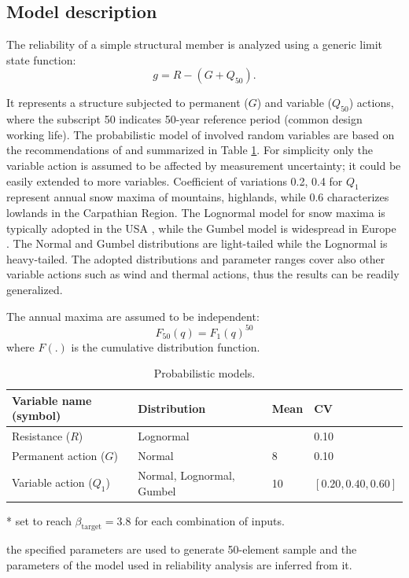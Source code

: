 \subsection{Model description}
The reliability of a simple structural member is analyzed using a generic limit state function:
\begin{equation}
	 g = R - \left( {G + {Q_{50}}} \right).
\end{equation}

It represents a structure subjected to permanent ($G$) and variable ($Q_{50}$) actions, where the subscript 50 indicates 50-year reference period (common design working life). The probabilistic model of involved random variables are based on the recommendations of \citep{JCSS_basis} and summarized in Table \ref{tab:prob_models_mu}. For simplicity only the variable action is assumed to be affected by measurement uncertainty; it could be easily extended to more variables. Coefficient of variations 0.2, 0.4 for $Q_1$ represent annual snow maxima of mountains, highlands, while 0.6 characterizes lowlands in the Carpathian Region. The Lognormal model for snow maxima is typically adopted in the USA \citep{ASCE2010}, while the Gumbel model is widespread in Europe \citep{Sanpaolesi1998, JCSS_load}. The Normal and Gumbel distributions are light-tailed while the Lognormal is heavy-tailed. The adopted distributions and parameter ranges cover also other variable actions such as wind and thermal actions, thus the results can be readily generalized.

The annual maxima are assumed to be independent:
\begin{equation}
\label{eq:gfun_mu}
	{F_{50}}\left( q \right) = {F_1}{\left( q \right)^{50}}
\end{equation}
where $F(.)$ is the cumulative distribution function.

\begin{table}[htbp!]
\caption{Probabilistic models.}
\centering
\label{tab:prob_models_mu}
\small
	\begin{threeparttable}
    \begin{tabular}{llll}
    \toprule
    Variable name (symbol)  & Distribution & Mean & CV \\
    \midrule
    \rowcolor{lightgrey} Resistance ($R$)  & Lognormal & \tnote{*} & 0.10  \\
    Permanent action ($G$) & Normal &  8  & 0.10 \\
    \rowcolor{lightgrey} Variable action ($Q_1$)\tnote{\textdagger}  & Normal, Lognormal, Gumbel & 10 & $[0.20, 0.40, 0.60]$ \\
    \bottomrule
    \end{tabular}
    \begin{tablenotes}
    	\item[*] set to reach $\beta_\mathrm{target} = 3.8$ for each combination of inputs.
	    \item[\textdagger] the specified parameters are used to generate 50-element sample and the parameters of the model used in reliability analysis are inferred from it.  
   	\end{tablenotes}
   	\end{threeparttable}
\end{table}

